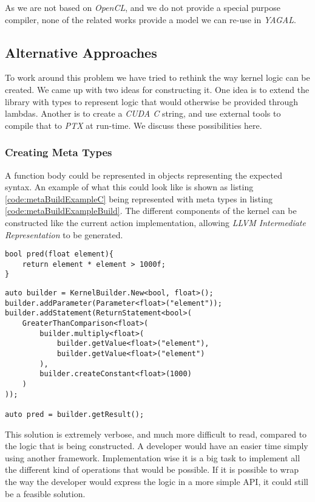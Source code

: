 As we are not based on \textit{OpenCL}, and we do not provide a special purpose compiler, none of the related works provide a model we can re-use in \textit{YAGAL}.

\subsection{Alternative Approaches}
To work around this problem we have tried to rethink the way kernel logic can be created. We came up with two ideas for constructing it. One idea is to extend the library with types to represent logic that would otherwise be provided through lambdas. Another is to create a \textit{CUDA C} string, and use external tools to compile that to \textit{PTX} at run-time. We discuss these possibilities here.

\subsubsection{Creating Meta Types}
A function body could be represented in objects representing the expected syntax. An example of what this could look like is shown as listing \ref{code:metaBuildExampleC} being represented with meta types in listing \ref{code:metaBuildExampleBuild}. The different components of the kernel can be constructed like the current action implementation, allowing \textit{LLVM Intermediate Representation} to be generated. 

\begin{lstlisting}[caption={Pseudo C code showing a kernel function.}, label={code:metaBuildExampleC}]
bool pred(float element){
    return element * element > 1000f;
}
\end{lstlisting}

\begin{lstlisting}[caption={Code showing possible construction of kernel function in an meta type solution.}, label={code:metaBuildExampleBuild}]
auto builder = KernelBuilder.New<bool, float>();
builder.addParameter(Parameter<float>("element"));
builder.addStatement(ReturnStatement<bool>(
    GreaterThanComparison<float>(
        builder.multiply<float>(
            builder.getValue<float>("element"), 
            builder.getValue<float>("element")
        ), 
        builder.createConstant<float>(1000)
    )
));

auto pred = builder.getResult();
\end{lstlisting}

This solution is extremely verbose, and much more difficult to read, compared to the logic that is being constructed. A developer would have an easier time simply using another framework. Implementation wise it is a big task to implement all the different kind of operations that would be possible. If it is possible to wrap the way the developer would express the logic in a more simple API, it could still be a feasible solution.

